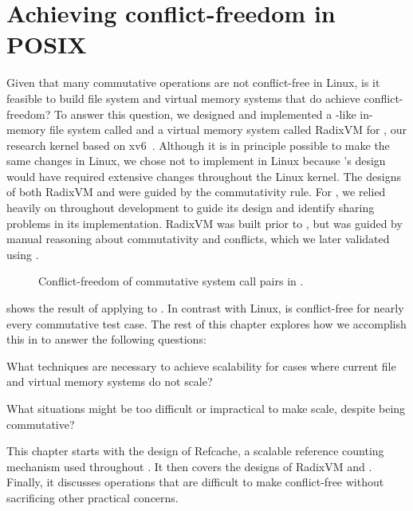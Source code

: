 \section{Achieving conflict-freedom in POSIX}

Given that many commutative operations are not conflict-free in Linux,
is it feasible to build file system and virtual memory systems that
do achieve conflict-freedom?
%
To answer this
question, we designed and implemented a -like in-memory
file system called \fs and a virtual memory system called RadixVM for
\sys, our research kernel based on xv6~\cite{xv6}.
%
Although it is in principle possible to make the same changes in Linux,
we chose not to implement \fs in Linux because \fs's design
would have required extensive changes throughout the Linux kernel.
%
The designs of both RadixVM and \fs were guided by the
commutativity rule.  For \fs, we relied heavily on \tool throughout
development to guide its design and identify sharing problems in its
implementation.  RadixVM
was built prior to
\tool, but was guided by manual reasoning about commutativity and
conflicts, which we later validated using \tool.

\begin{figure*}
\small
\centering

\caption{Conflict-freedom of commutative system call pairs in \sys.}
\label{fig:testcase-breakdown-sv6}
\end{figure*}

 shows the result of applying \tool
to \sys.  In contrast with Linux, \sys is conflict-free for nearly
every commutative test case.  The rest of this chapter explores how we
accomplish this in \sys to answer the following questions:

\begin{CompactItemize}

\item What techniques are necessary to achieve scalability for
      cases where current file and virtual memory systems do not
      scale?

\item What situations might be too difficult or impractical to
      make scale, despite being commutative?

\end{CompactItemize}

This chapter starts with the design of Refcache, a scalable reference
counting mechanism used throughout \sys.  It then covers the designs
of RadixVM and \fs.  Finally, it discusses operations that are
difficult to make conflict-free without sacrificing other practical
concerns.

